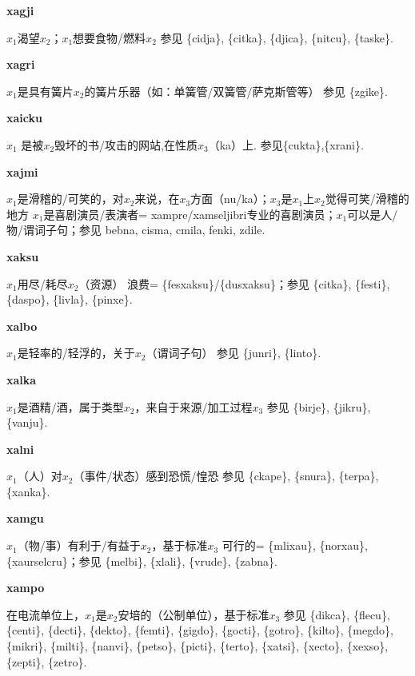 \documentclass[notitlepage,twocolumn,a4paper,10pt]{book}
\begin{document}
{\sffamily\bfseries xagji} $x_1$渴望$x_2$；$x_1$想要食物\slash{}燃料$x_2$ \textemdash{} 参见 \{cidja\}, \{citka\}, \{djica\}, \{nitcu\}, \{taske\}.

{\sffamily\bfseries xagri} $x_1$是具有簧片$x_2$的簧片乐器（如：单簧管\slash{}双簧管\slash{}萨克斯管等） \textemdash{} 参见 \{zgike\}.

{\sffamily\bfseries xaicku} $x_1$ 是被$x_2$毁坏的书\slash{}攻击的网站,在性质$x_3$（ka）上. \textemdash{} 参见\{cukta\},\{xrani\}.

{\sffamily\bfseries xajmi}\enspace {\ttfamily\bfseries[xam]}  $x_1$是滑稽的\slash{}可笑的，对$x_2$来说，在$x_3$方面（nu\slash{}ka）；$x_3$是$x_1$上$x_2$觉得可笑\slash{}滑稽的地方 \textemdash{} $x_1$是喜剧演员\slash{}表演者= {xampre}\slash{}{xamseljibri}专业的喜剧演员；$x_1$可以是人\slash{}物\slash{}谓词子句；参见 {bebna}, {cisma}, {cmila}, {fenki}, {zdile}.

{\sffamily\bfseries xaksu}\enspace {\ttfamily\bfseries[xak]}  $x_1$用尽\slash{}耗尽$x_2$（资源） \textemdash{} 浪费= \{fesxaksu\}\slash{}\{dusxaksu\}；参见 \{citka\}, \{festi\}, \{daspo\}, \{livla\}, \{pinxe\}.

{\sffamily\bfseries xalbo} $x_1$是轻率的\slash{}轻浮的，关于$x_2$（谓词子句） \textemdash{} 参见 \{junri\}, \{linto\}.

{\sffamily\bfseries xalka}\enspace {\ttfamily\bfseries[xal]}  $x_1$是酒精\slash{}酒，属于类型$x_2$，来自于来源\slash{}加工过程$x_3$ \textemdash{} 参见 \{birje\}, \{jikru\}, \{vanju\}.

{\sffamily\bfseries xalni} $x_1$（人）对$x_2$（事件\slash{}状态）感到恐慌\slash{}惶恐 \textemdash{} 参见 \{ckape\}, \{snura\}, \{terpa\}, \{xanka\}.

{\sffamily\bfseries xamgu}  $x_1$（物\slash{}事）有利于\slash{}有益于$x_2$，基于标准$x_3$ \textemdash{} 可行的= \{mlixau\}, \{norxau\}, \{xaurselcru\}；参见 \{melbi\}, \{xlali\}, \{vrude\}, \{zabna\}.

{\sffamily\bfseries xampo}\enspace {\ttfamily\bfseries[xap     xa'o]}  在电流单位上，$x_1$是$x_2$安培的（公制单位），基于标准$x_3$ \textemdash{} 参见 \{dikca\}, \{flecu\}, \{centi\}, \{decti\}, \{dekto\}, \{femti\}, \{gigdo\}, \{gocti\}, \{gotro\}, \{kilto\}, \{megdo\}, \{mikri\}, \{milti\}, \{nanvi\}, \{petso\}, \{picti\}, \{terto\}, \{xatsi\}, \{xecto\}, \{xexso\}, \{zepti\}, \{zetro\}.
\end{document}
